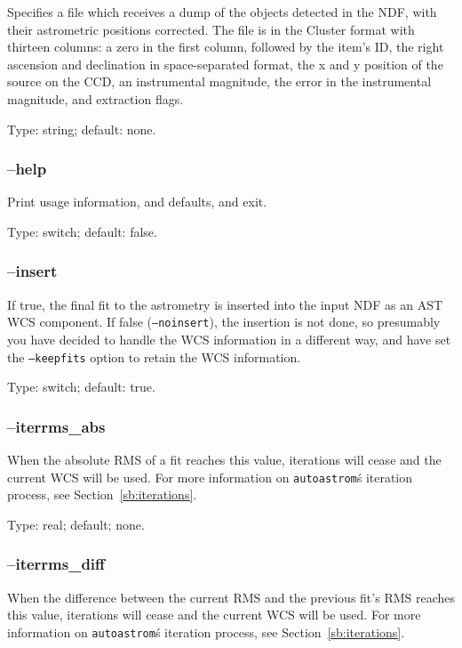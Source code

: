 \documentclass[twoside,11pt]{article}
\newcommand{\xlabel}[1]{}
\newcommand{\autoastrom}{\texttt{autoastrom}}
\begin{document}
Specifies a file which receives a dump of the objects detected in the NDF,
with their astrometric positions corrected. The file is in the Cluster format
with thirteen columns: a zero in the first column, followed by the item's ID,
the right ascension and declination in space-separated format, the x and y
position of the source on the CCD, an instrumental magnitude, the error in the
instrumental magnitude, and extraction flags.

Type: string; default: none.

\subsubsection{\xlabel{sb_options_help}--help\label{sb:options:help}}

Print usage information, and defaults, and exit.

Type: switch; default: false.

\subsubsection{\xlabel{sb_options_insert}--insert\label{sb:options:insert}}

If true, the final fit to the astrometry is inserted into the input NDF as an
AST WCS component.  If false (\texttt{--noinsert}), the insertion is not done,
so presumably you have decided to handle the WCS information in a different
way, and have set the \texttt{--keepfits} option to retain the WCS
information.

Type: switch; default: true.

\subsubsection{\xlabel{sb_options_iterrms_abs}--iterrms\_abs\label{sb:options:iterrms_abs}}

When the absolute RMS of a fit reaches this value, iterations will cease and
the current WCS will be used. For more information on \autoastrom\'s iteration
process, see Section~\ref{sb:iterations}.

Type: real; default; none.

\subsubsection{\xlabel{sb_options_iterrms_diff}--iterrms\_diff\label{sb:options:iterrms_diff}}

When the difference between the current RMS and the previous fit's RMS reaches
this value, iterations will cease and the current WCS will be used. For more
information on \autoastrom\'s iteration process, see
Section~\ref{sb:iterations}.
\end{document}
